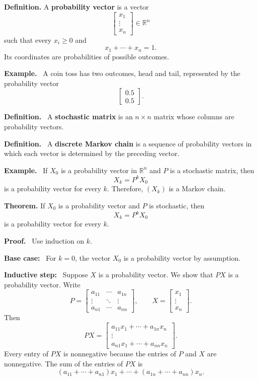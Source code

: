 \documentclass[letterpaper]{article}
\newcommand{\noteheader}[1]{\par\medskip\noindent\textbf{#1}\ }
\begin{document}
\clearpage

\textbf{Definition.} A \textbf{probability vector} is a vector
\[
\begin{bmatrix}x_1\\\vdots\\x_n\end{bmatrix}\in\mathbb{R}^n
\]
such that every $x_i\geq0$ and
\[
x_1+\cdots+x_n=1.
\]
Its coordinates are probabilities of possible outcomes.

\noteheader{Example.} A coin toss has two outcomes, head and tail, represented by the probability vector
\[
\begin{bmatrix}0.5\\0.5\end{bmatrix}.
\]

\bigskip

\noteheader{Definition.} A \textbf{stochastic matrix} is an $n\times n$ matrix whose columns are probability vectors.

\bigskip

\noteheader{Definition.} A \textbf{discrete Markov chain} is a sequence of probability vectors in which each vector is determined by the preceding vector.

\noteheader{Example.} If $X_0$ is a probability vector in $\mathbb{R}^n$ and $P$ is a stochastic matrix, then
\[
X_k=P^kX_0
\]
is a probability vector for every $k$. Therefore, $(X_k)$ is a Markov chain.

\clearpage

\textbf{Theorem.} If $X_0$ is a probability vector and $P$ is stochastic, then
\[
X_k=P^kX_0
\]
is a probability vector for every $k$.

\noteheader{Proof.} Use induction on $k$.

\noteheader{Base case:} For $k=0$, the vector $X_0$ is a probability vector by assumption.

\noteheader{Inductive step:} Suppose $X$ is a probability vector. We show that $PX$ is a probability vector. Write
\[
P=\begin{bmatrix}
a_{11}&\cdots&a_{1n}\\
\vdots&\ddots&\vdots\\
a_{n1}&\cdots&a_{nn}
\end{bmatrix},
\qquad
X=\begin{bmatrix}x_1\\\vdots\\x_n\end{bmatrix}.
\]
Then
\[
PX=\begin{bmatrix}
a_{11}x_1+\cdots+a_{1n}x_n\\
\vdots\\
a_{n1}x_1+\cdots+a_{nn}x_n
\end{bmatrix}.
\]
Every entry of $PX$ is nonnegative because the entries of $P$ and $X$ are nonnegative. The sum of the entries of $PX$ is
\[
(a_{11}+\cdots+a_{n1})x_1+\cdots+(a_{1n}+\cdots+a_{nn})x_n.
\]
\end{document}
